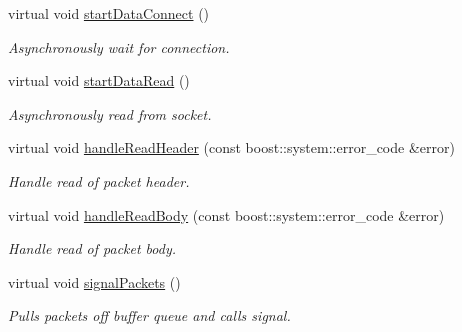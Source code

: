 \begin{DoxyCompactItemize}
\item 
\hypertarget{classquanergy_1_1client_1_1TCPClient_a682a68ceae7d329b9553436c42e5ab0a}{virtual void \hyperlink{classquanergy_1_1client_1_1TCPClient_a682a68ceae7d329b9553436c42e5ab0a}{start\-Data\-Connect} ()}\label{classquanergy_1_1client_1_1TCPClient_a682a68ceae7d329b9553436c42e5ab0a}

\begin{DoxyCompactList}\small\item\em Asynchronously wait for connection. \end{DoxyCompactList}\item 
\hypertarget{classquanergy_1_1client_1_1TCPClient_a8f586dd803470de5c70a78d13c9ed66a}{virtual void \hyperlink{classquanergy_1_1client_1_1TCPClient_a8f586dd803470de5c70a78d13c9ed66a}{start\-Data\-Read} ()}\label{classquanergy_1_1client_1_1TCPClient_a8f586dd803470de5c70a78d13c9ed66a}

\begin{DoxyCompactList}\small\item\em Asynchronously read from socket. \end{DoxyCompactList}\item 
\hypertarget{classquanergy_1_1client_1_1TCPClient_a6fef2c07f3985c5bc646933d58542475}{virtual void \hyperlink{classquanergy_1_1client_1_1TCPClient_a6fef2c07f3985c5bc646933d58542475}{handle\-Read\-Header} (const boost\-::system\-::error\-\_\-code \&error)}\label{classquanergy_1_1client_1_1TCPClient_a6fef2c07f3985c5bc646933d58542475}

\begin{DoxyCompactList}\small\item\em Handle read of packet header. \end{DoxyCompactList}\item 
\hypertarget{classquanergy_1_1client_1_1TCPClient_abe037d34a60b07c3af30cabecede4fdc}{virtual void \hyperlink{classquanergy_1_1client_1_1TCPClient_abe037d34a60b07c3af30cabecede4fdc}{handle\-Read\-Body} (const boost\-::system\-::error\-\_\-code \&error)}\label{classquanergy_1_1client_1_1TCPClient_abe037d34a60b07c3af30cabecede4fdc}

\begin{DoxyCompactList}\small\item\em Handle read of packet body. \end{DoxyCompactList}\item 
\hypertarget{classquanergy_1_1client_1_1TCPClient_a2ad2a7e7f4d541a3b0b23cf6489e5ff1}{virtual void \hyperlink{classquanergy_1_1client_1_1TCPClient_a2ad2a7e7f4d541a3b0b23cf6489e5ff1}{signal\-Packets} ()}\label{classquanergy_1_1client_1_1TCPClient_a2ad2a7e7f4d541a3b0b23cf6489e5ff1}

\begin{DoxyCompactList}\small\item\em Pulls packets off buffer queue and calls signal. \end{DoxyCompactList}\end{DoxyCompactItemize}
